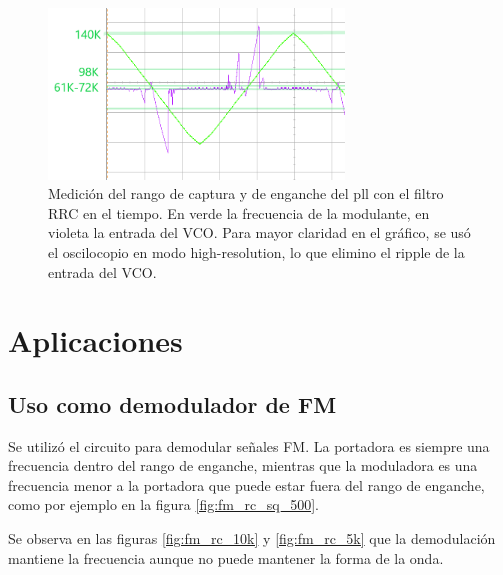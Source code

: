 \documentclass[../../tc_tp6_main.tex]{subfiles}
\begin{document}
\begin{figure}
	\centering
	\includegraphics[width = 0.7\textwidth]{figures/gracias_santi.png}
	\caption{Medici\'on del rango de captura y de enganche del pll con el filtro RRC en el tiempo. En verde la frecuencia de la modulante, en violeta la entrada del VCO. Para mayor claridad en el gr\'afico, se us\'o el oscilocopio en modo high-resolution, lo que elimino el ripple de la entrada del VCO.}
	\label{fig:santi}
\end{figure}


\section{Aplicaciones}
\subsection{Uso como demodulador de FM}

Se utiliz\'o el circuito para demodular se\~nales FM. La portadora es siempre una frecuencia dentro del rango de enganche, mientras que la moduladora es una frecuencia menor a la portadora que puede estar fuera del rango de enganche, como por ejemplo en la figura \ref{fig:fm_rc_sq_500}.

Se observa en las figuras \ref{fig:fm_rc_10k} y \ref{fig:fm_rc_5k} que la demodulaci\'on mantiene la frecuencia aunque no puede mantener la forma de la onda.
\end{document}
